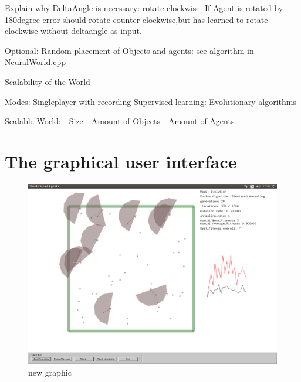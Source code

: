 \documentclass[10pt,a4paper,DIV=11]{scrreprt}
\begin{document}
Explain why DeltaAngle is necessary:
rotate clockwise. If Agent is rotated by 180degree error should rotate counter-clockwise,but
has learned to rotate clockwise without deltaangle as input.


Optional: Random placement of Objects and agents: see algorithm in NeuralWorld.cpp



Scalability of the World


Modes:
Singleplayer with recording
Supervised learning:
Evolutionary algorithms

Scalable World:
- Size
- Amount of Objects
- Amount of Agents

\section{The graphical user interface}


\begin{center}
	\begin{figure}[H]
		\centering
		\includegraphics[width=1.0\textwidth,scale=1.0]{files/new_graphic.png}  
		\caption{new graphic}
		\label{fig:cosys-transform}
	\end{figure}
\end{center}
\end{document}
